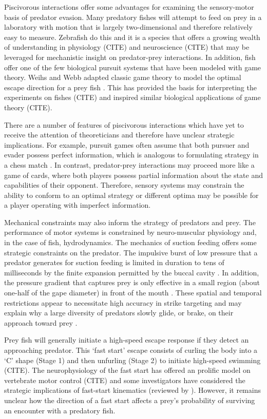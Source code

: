 \documentclass[12pt]{article}
\begin{document}
Piscivorous interactions offer some advantages for examining the sensory-motor basis of predator evasion. Many predatory fishes will attempt to feed on prey in a laboratory with motion that is largely two-dimensional and therefore relatively easy to measure. Zebrafish do this \citep{Stewart:2013bh} and it is a species that offers a growing wealth of understanding in physiology (CITE) and neuroscience (CITE) that may be leveraged for mechanistic insight on predator-prey interactions. In addition, fish offer one of the few biological pursuit systems that have been modeled with game theory. Weihs and Webb adapted classic game theory to model the optimal escape direction for a prey fish \citep{Weihs:1984tb}. This has provided the basis for interpreting the experiments on fishes (CITE) and inspired similar biological applications of game theory (CITE). 
	
There are a number of features of piscivorous interactions which have yet to receive the attention of theoreticians and therefore have unclear strategic implications. For example, pursuit games often assume that both pursuer and evader possess perfect information, which is analogous to formulating strategy in a chess match \citep{Salen:2004wp}. In contrast, predator-prey interactions may proceed more like a game of cards, where both players possess partial information about the state and capabilities of their opponent. Therefore, sensory systems may constrain the ability to conform to an optimal strategy or different optima may be possible for a player operating with imperfect information. 

Mechanical constraints may also inform the strategy of predators and prey. The performance of motor systems is constrained by neuro-muscular physiology and, in the case of fish, hydrodynamics. The mechanics of suction feeding offers some strategic constraints on the predator. The impulsive burst of low pressure that a predator generates for suction feeding is limited in duration to tens of milliseconds  by the finite expansion permitted by the buccal cavity \citep{Wainwright:2001ufa}. In addition, the pressure gradient that captures prey is only effective in a small region (about one-half of the gape diameter) in front of the mouth \citep{Day:2005p5856}. These spatial and temporal restrictions appear to necessitate high accuracy in strike targeting and may explain why a large diversity of predators slowly glide, or brake, on their approach toward prey \citep{Higham:2005iu, Higham:2007go}. 

Prey fish will generally initiate a high-speed escape response if they detect an approaching predator. This ‘fast start’ escape consists of curling the body into a ‘C’ shape (Stage 1) and then unfurling (Stage 2) to initiate high-speed swimming (CITE). The neurophysiology of the fast start has offered an prolific model on vertebrate motor control (CITE) and some investigators have considered the strategic implications of fast-start kinematics (reviewed by \cite{Domenici:2011tv, Domenici:2011vl}). However, it remains unclear how the direction of a fast start affects a prey’s probability of surviving an encounter with a predatory fish. 
\end{document}
